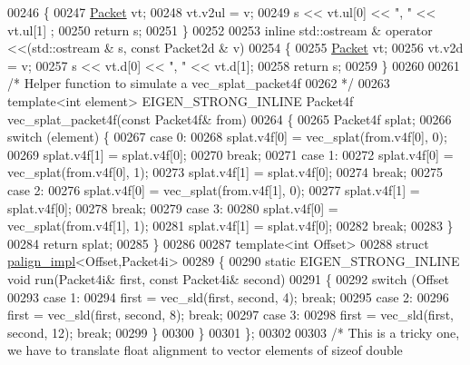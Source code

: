 \begin{DoxyCode}
{00246 \{
00247   \hyperlink{union_eigen_1_1internal_1_1_packet}{Packet} vt;
00248   vt.v2ul = v;
00249   s << vt.ul[0] << \textcolor{stringliteral}{", "} << vt.ul[1] ;
00250   \textcolor{keywordflow}{return} s;
00251 \}
00252 
00253 \textcolor{keyword}{inline} std::ostream & operator <<(std::ostream & s, \textcolor{keyword}{const} Packet2d & v)
00254 \{
00255   \hyperlink{union_eigen_1_1internal_1_1_packet}{Packet} vt;
00256   vt.v2d = v;
00257   s << vt.d[0] << \textcolor{stringliteral}{", "} << vt.d[1];
00258   \textcolor{keywordflow}{return} s;
00259 \}
00260 
00261 \textcolor{comment}{/* Helper function to simulate a vec\_splat\_packet4f}
00262 \textcolor{comment}{ */}
00263 \textcolor{keyword}{template}<\textcolor{keywordtype}{int} element> EIGEN\_STRONG\_INLINE Packet4f vec\_splat\_packet4f(\textcolor{keyword}{const} Packet4f&   from)
00264 \{
00265   Packet4f splat;
00266   \textcolor{keywordflow}{switch} (element) \{
00267   \textcolor{keywordflow}{case} 0:
00268     splat.v4f[0] = vec\_splat(from.v4f[0], 0);
00269     splat.v4f[1] = splat.v4f[0];
00270     \textcolor{keywordflow}{break};
00271   \textcolor{keywordflow}{case} 1:
00272     splat.v4f[0] = vec\_splat(from.v4f[0], 1);
00273     splat.v4f[1] = splat.v4f[0];
00274     \textcolor{keywordflow}{break};
00275   \textcolor{keywordflow}{case} 2:
00276     splat.v4f[0] = vec\_splat(from.v4f[1], 0);
00277     splat.v4f[1] = splat.v4f[0];
00278     \textcolor{keywordflow}{break};
00279   \textcolor{keywordflow}{case} 3:
00280     splat.v4f[0] = vec\_splat(from.v4f[1], 1);
00281     splat.v4f[1] = splat.v4f[0];
00282     \textcolor{keywordflow}{break};
00283   \}
00284   \textcolor{keywordflow}{return} splat;
00285 \}
00286 
00287 \textcolor{keyword}{template}<\textcolor{keywordtype}{int} Offset>
00288 \textcolor{keyword}{struct }\hyperlink{struct_eigen_1_1internal_1_1palign__impl}{palign\_impl}<Offset,Packet4i>
00289 \{
00290   \textcolor{keyword}{static} EIGEN\_STRONG\_INLINE \textcolor{keywordtype}{void} run(Packet4i& first, \textcolor{keyword}{const} Packet4i& second)
00291   \{
00292     \textcolor{keywordflow}{switch} (Offset %
00293     \textcolor{keywordflow}{case} 1:
00294       first = vec\_sld(first, second, 4); \textcolor{keywordflow}{break};
00295     \textcolor{keywordflow}{case} 2:
00296       first = vec\_sld(first, second, 8); \textcolor{keywordflow}{break};
00297     \textcolor{keywordflow}{case} 3:
00298       first = vec\_sld(first, second, 12); \textcolor{keywordflow}{break};
00299     \}
00300   \}
00301 \};
00302 
00303 \textcolor{comment}{/* This is a tricky one, we have to translate float alignment to vector elements of sizeof double}
}
\end{DoxyCode}
